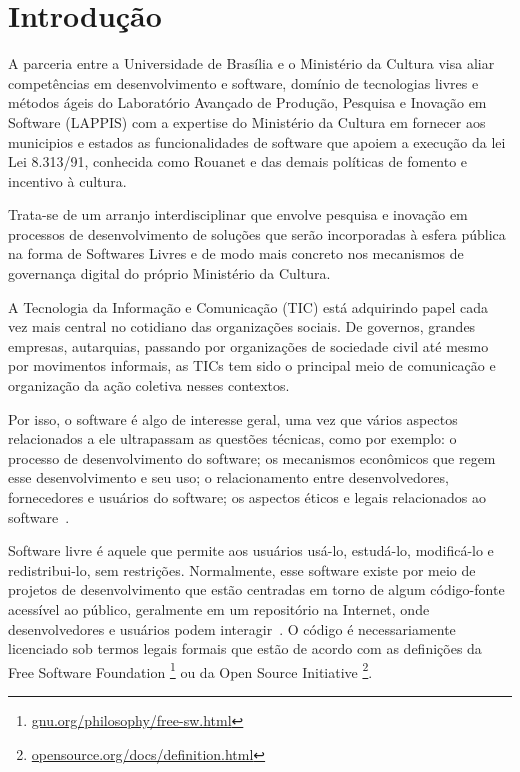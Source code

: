 \section{Introdução}
\label{introducao}

A parceria entre a Universidade de Brasília e o Ministério da Cultura visa aliar 
competências em desenvolvimento e software, domínio de tecnologias livres e 
métodos ágeis do Laboratório Avançado de Produção, Pesquisa e Inovação em Software (LAPPIS)
com a expertise do Ministério da Cultura em fornecer aos municipios e estados 
as funcionalidades de software que apoiem a execução da lei Lei 8.313/91,
conhecida como Rouanet e das demais políticas de fomento e incentivo à cultura. 

Trata-se de um arranjo interdisciplinar que envolve pesquisa e inovação em 
processos de desenvolvimento de soluções que serão incorporadas à esfera 
pública na forma de Softwares Livres e de modo mais concreto nos mecanismos de 
governança digital do próprio Ministério da Cultura. 

A Tecnologia da Informação e Comunicação (TIC) está adquirindo papel cada vez 
mais central no cotidiano das organizações sociais. De governos, grandes empresas, 
autarquias, passando por organizações de sociedade civil até mesmo por movimentos 
informais, as TICs tem sido o principal meio de comunicação e organização da 
ação coletiva nesses contextos. 

Por isso, o software é algo de interesse geral, uma vez que vários aspectos
relacionados a ele ultrapassam as questões técnicas, como por exemplo: o
processo de desenvolvimento do software; os mecanismos econômicos que regem
esse desenvolvimento e seu uso; o relacionamento entre desenvolvedores,
fornecedores e usuários do software; os aspectos éticos e legais relacionados
ao software~\cite{kon2011jai}.

Software livre é aquele que permite aos usuários 
usá-lo, estudá-lo, modificá-lo e redistribui-lo, sem restrições. Normalmente, 
esse software existe por meio de projetos de desenvolvimento que estão centradas 
em torno de algum código-fonte acessível ao público, geralmente em um repositório na Internet,
onde desenvolvedores e usuários podem interagir~\cite{meirelles2013}. O código
é necessariamente licenciado sob termos legais formais que estão de acordo com
as definições da Free Software Foundation
\footnote{\url{gnu.org/philosophy/free-sw.html}} ou da Open Source Initiative
\footnote{\url{opensource.org/docs/definition.html}}.


